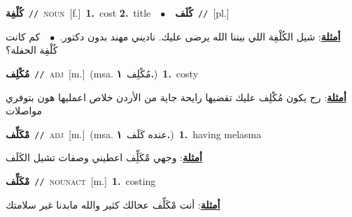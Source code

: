 \documentclass[10pt,a4paper,twoside]{article} %
\begin{document}
\begin{multicols}{2}
{\setlength\topsep{0pt}\textbf{\foreignlanguage{arabic}{كُلْفِة}}\ {\color{gray}\texttt{//}\color{black}}\ \textsc{noun}\ [f.]\ \textbf{1.}~cost  \textbf{2.}~title\ \ $\bullet$\ \ \setlength\topsep{0pt}\textbf{\foreignlanguage{arabic}{كُلَف}}\ {\color{gray}\texttt{//}\color{black}}\ [pl.]\  \begin{flushright}\color{gray}\foreignlanguage{arabic}{\textbf{\underline{\foreignlanguage{arabic}{أمثلة}}}: شيل الكُلْفِة اللي بيننا الله يرضى عليك. ناديني مهند بدون دكتور.\ $\bullet$\ \  كم كانت كُلْفِة الحفلة؟}\end{flushright}\color{black}} \vspace{2mm}

{\setlength\topsep{0pt}\textbf{\foreignlanguage{arabic}{مُكْلِف}}\ {\color{gray}\texttt{//}\color{black}}\ \textsc{adj}\ [m.]\ \color{gray}(msa. \foreignlanguage{arabic}{مُكْلِف}~\foreignlanguage{arabic}{\textbf{١.}})\color{black}\ \textbf{1.}~costy\  \begin{flushright}\color{gray}\foreignlanguage{arabic}{\textbf{\underline{\foreignlanguage{arabic}{أمثلة}}}: رح يكون مُكْلِف عليك تقضيها رايحة جاية من الأردن خلاص اعمليها هون بتوفري مواصلات}\end{flushright}\color{black}} \vspace{2mm}

{\setlength\topsep{0pt}\textbf{\foreignlanguage{arabic}{مْكَلِّف}}\ {\color{gray}\texttt{//}\color{black}}\ \textsc{adj}\ [m.]\ \color{gray}(msa. \foreignlanguage{arabic}{عنده كَلَف}~\foreignlanguage{arabic}{\textbf{١.}})\color{black}\ \textbf{1.}~having melasma\  \begin{flushright}\color{gray}\foreignlanguage{arabic}{\textbf{\underline{\foreignlanguage{arabic}{أمثلة}}}: وجهي مْكَلِِّف اعطيني وصفات تشيل الكَلَف}\end{flushright}\color{black}} \vspace{2mm}

{\setlength\topsep{0pt}\textbf{\foreignlanguage{arabic}{مْكَلِّف}}\ {\color{gray}\texttt{//}\color{black}}\ \textsc{noun\textunderscore act}\ [m.]\ \textbf{1.}~costing\  \begin{flushright}\color{gray}\foreignlanguage{arabic}{\textbf{\underline{\foreignlanguage{arabic}{أمثلة}}}: أنت مْكَلِّف عحالك كثير والله مابدنا غير سلامتك}\end{flushright}\color{black}} \vspace{2mm}


\end{multicols}
\end{document}
